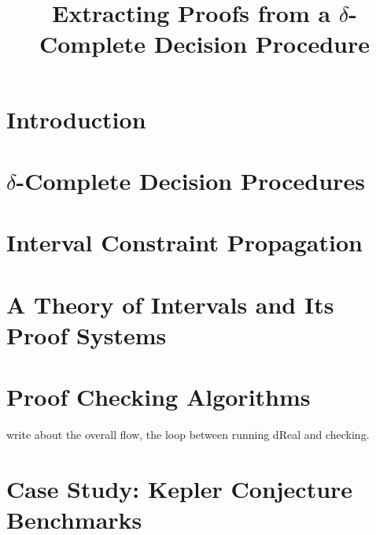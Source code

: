 \documentclass[envcountsect]{llncs}
\title{Extracting Proofs from a $\delta$-Complete Decision Procedure}
\author{}
\institute{Carnegie Mellon University, Pittsburgh, PA 15213}
\begin{document}
\maketitle

\begin{abstract}
\end{abstract}

\section{Introduction}

\section{$\delta$-Complete Decision Procedures}

\section{Interval Constraint Propagation}

\section{A Theory of Intervals and Its Proof Systems}

\section{Proof Checking Algorithms}

write about the overall flow, the loop between running dReal and checking. 

\section{Case Study: Kepler Conjecture Benchmarks}






\end{document}

